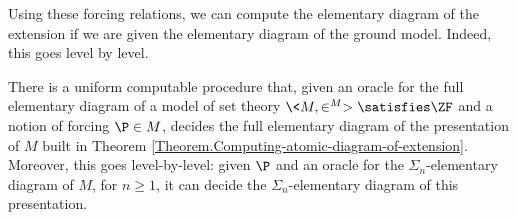 \documentclass{amsart}
\begin{document}
 Using these forcing relations, we can compute the elementary diagram of the extension if we are given the elementary diagram of the ground model. Indeed, this goes level by level.
 
 \begin{theorem}\label{Theorem.Computing-diagram-of-extension}
 There is a uniform computable procedure that, given an oracle for the full elementary diagram of a model of set theory $\<M,\in^M>\satisfies\ZF$ and a notion of forcing $\P\in M$, decides the full elementary diagram of the presentation of $M$ built in Theorem \ref{Theorem.Computing-atomic-diagram-of-extension}.  Moreover, this goes level-by-level: given $\P$ and an oracle for the $\Sigma_n$-elementary diagram of $M$, for $n \ge 1$, it can decide the $\Sigma_n$-elementary diagram of this presentation.
 \end{theorem}
 
\end{document}
